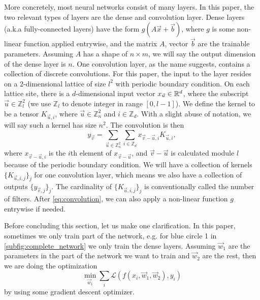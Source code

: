 More concretely, most neural networks consist of many layers.
In this paper, the two relevant types of layers are the dense and convolution layer.
Dense layers (a.k.a fully-connected layers) have the form $g(A\vec{x}+\vec{b})$, where $g$ is some non-linear function applied entrywise, and the matrix $A$, vector $\vec{b}$ are the trainable parameters.
Assuming $A$ has a shape of $n\times m$, we will say the output dimension of the dense layer is $n$.
One convolution layer, as the name suggests, contains a collection of discrete convolutions.
For this paper, the input to the layer resides on a $2$-dimensional lattice of size $l^2$ with periodic boundary condition.
On each lattice site, there is a $d$-dimensional input vector $x_{\vec{u}} \in \mathbb{R}^d$, where the subscript $\vec{u} \in \mathbb{Z}_l^2$ (we use $\mathbb{Z}_l$ to denote integer in range $[0,l-1]$).
We define the kernel to be a tensor $K_{\vec{u},i}$, where $\vec{u} \in \mathbb{Z}_n^2$ and $i \in \mathbb{Z}_d$. With a slight abuse of notation, we will say such a kernel has size $n^2$. The convolution is then
\begin{equation}
\label{eq:convolution}
y_{\vec{v}} = \sum_{\vec{u} \in \mathbb{Z}_n^2} \sum_{i \in \mathbb{Z}_d} x_{\vec{v}-\vec{u}, i} K_{\vec{u}, i},
\end{equation}
where $x_{\vec{v}-\vec{u},i}$ is the $i$th element of $x_{\vec{v}-\vec{u}}$, and $\vec{v}-\vec{u}$ is calculated module $l$ because of the periodic boundary condition.
We will have a collection of kernels $\{K_{\vec{u}, i,j}\}_j$ for one convolution layer, which means we also have a collection of outputs $\{y_{\vec{v},j}\}_j$.
The cardinality of $\{K_{\vec{u}, i,j}\}_j$ is conventionally called the number of filters.
After \autoref{eq:convolution}, we can also apply a non-linear function $g$ entrywise if needed.

Before concluding this section, let us make one clarification.
In this paper, sometimes we only train part of the network, e.g. for blue circle 1 in \autoref{subfig:complete_network} we only train the dense layers.
Assuming $\vec{w}_1$ are the parameters in the part of the network we want to train and $\vec{w}_2$ are the rest, then we are doing the optimization
\begin{equation}
\min_{\vec{w}_1}\sum_i \mathcal{L}(f(x_i, \vec{w}_1, \vec{w}_2), y_i)
\end{equation}
by using some gradient descent optimizer.
